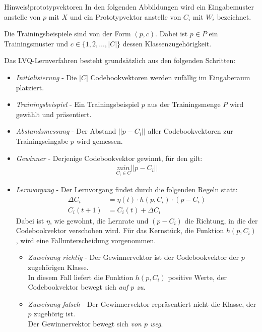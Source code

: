 \begin{hint}{Hinweis!}{prototypvektoren}
	In den folgenden Abbildungen wird ein Eingabemuster anstelle von $p$ mit $X$ und ein Prototypvektor anstelle von $C_i$ mit $W_i$ bezeichnet.
\end{hint}

Die Trainingsbeispiele sind von der Form $(p,c)$. Dabei ist $p \in P$ ein Trainingsmuster und $c \in \{1,2, \ldots, |C|\}$ dessen Klassenzugehörigkeit.

Das LVQ-Lernverfahren besteht grundsätzlich aus den folgenden Schritten:
\begin{itemize}
	\item \emph{Initialisierung} - Die $|C|$ Codebookvektoren werden zufällig im Eingaberaum platziert.
	\item \emph{Trainingsbeispiel} - Ein Trainingsbeispiel $p$ aus der Trainingsmenge $P$ wird gewählt und präsentiert.
	\item \emph{Abstandsmessung} - Der Abstand $||p - C_i||$ aller Codebookvektoren zur Trainingseingabe $p$ wird gemessen.
	\item \emph{Gewinner} - Derjenige Codebookvektor gewinnt, für den gilt:
	\begin{align*}
		\underset{C_i \in C}{min} ||p - C_i||		
	\end{align*}
	\item \emph{Lernvorgang} - Der Lernvorgang findet durch die folgenden Regeln statt:
	\begin{align*}
		\Delta C_i &= \eta(t) \cdot h(p, C_i) \cdot (p-C_i) \\
		C_i(t+1) &= C_i(t) + \Delta C_i
	\end{align*}
	Dabei ist $\eta$, wie gewohnt, die Lernrate und $(p-C_i)$ die Richtung, in die der Codebookvektor verschoben wird.
	Für das Kernstück, die Funktion $h(p, C_i)$, wird eine Fallunterscheidung vorgenommen.
	\begin{itemize}
		\item \emph{Zuweisung richtig} - Der Gewinnervektor ist der Codebookvektor der $p$ zugehörigen Klasse.\\
		In diesem Fall liefert die Funktion $h(p, C_i)$ positive Werte, der Codebookvektor bewegt sich \emph{auf $p$ zu}.
		\item \emph{Zuweisung falsch} - Der Gewinnervektor repräsentiert nicht die Klasse, der $p$ zugehörig ist.\\
		Der Gewinnervektor bewegt sich \emph{von $p$ weg}.
	\end{itemize}
\end{itemize}

